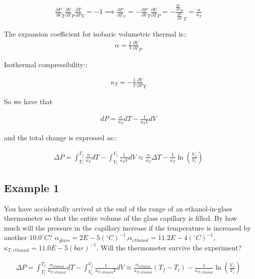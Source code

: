 \documentclass[12pt]{article}
\begin{document}
\begin{align*}
    \frac{\partial P}{\partial V}_T\frac{\partial V}{\partial T}_P\frac{\partial T}{\partial P}_V=-1\implies \frac{\partial P}{\partial T}_v=-\frac{\partial P}{\partial V}_T\frac{\partial V}{\partial T}_P=-\frac{\frac{\partial V}{\partial T}_P}{\frac{\partial V}{\partial P}}_T=\frac{\alpha}{\kappa_T}
\end{align*}

The expansion coefficient for isobaric volumetric thermal is::
\begin{align*}
    \alpha=\frac{1}{V}\frac{\partial V}{\partial T}_P
\end{align*}

Isothermal compressibility::

\begin{align*}
    \kappa_T=-\frac{1}{V}\frac{\partial V}{\partial P}_T
\end{align*}

So we have that

\begin{align*}
    dP=\frac{\alpha}{\kappa_T}dT-\frac{1}{\kappa_T V}dV
\end{align*}

and the total change is expressed as::

\begin{align*}
    \Delta P=\int_{T_i}^{T_f}\frac{\alpha}{\kappa_T}dT-\int_{V_i}^{V_f}\frac{1}{\kappa_T V}dV\approx \frac{\alpha}{\kappa_T}\Delta T-\frac{1}{\kappa_T}\ln(\frac{V_f}{V_i})
\end{align*}

\subsection*{Example 1}

You have accidentally arrived at the end of the range of an ethanol-in-glass
thermometer so that the entire volume of the glass capillary is filled. By how much
will the pressure in the capillary increase if the temperature is increased by another $10.0^{\circ}C$? $\alpha_{glass}=2E-5(^{\circ}C)^{-1}$,$\alpha_{ethanol}=11.2E-4(^{\circ}C)^{-1}$, $\kappa_{T,ethanol}=11.0E-5(bar)^{-1}$. Will the thermometer survive the experiment?

\begin{align*}
    \Delta P=\int_{T_i}^{T_f}\frac{\alpha_{ethanol}}{\kappa_{T,ethanol}}dT-\int_{V_i}^{V_f}\frac{1}{\kappa_{T,ethanol}V}dV\approx \frac{\alpha_{ethanol}}{\kappa_{T,ethanol}}(T_f-T_i)-\frac{1}{\kappa_{T,ethanol}}\ln(\frac{V_f}{V_i})
\end{align*}
\end{document}
